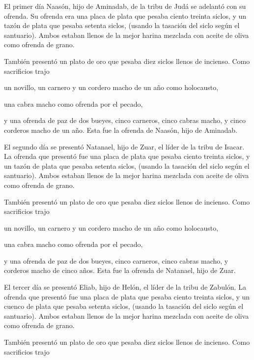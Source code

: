  El primer día Naasón, hijo de Aminadab, de la tribu de
Judá se adelantó con su ofrenda.  Su ofrenda era una
placa de plata que pesaba ciento treinta siclos, y un tazón de plata que
pesaba setenta siclos, (usando la tasación del siclo según el
santuario). Ambos estaban llenos de la mejor harina mezclada con aceite
de oliva como ofrenda de grano.

 También presentó un plato de oro que pesaba diez siclos
llenos de incienso. Como sacrificios trajo

 un novillo, un carnero y un cordero macho de un año como
holocausto,

 una cabra macho como ofrenda por el pecado,

 y una ofrenda de paz de dos bueyes, cinco carneros,
cinco cabras macho, y cinco corderos macho de un año. Esta fue la
ofrenda de Naasón, hijo de Aminadab.

 El segundo día se presentó Natanael, hijo de Zuar, el
líder de la tribu de Isacar.  La ofrenda que presentó fue
una placa de plata que pesaba ciento treinta siclos, y un tazón de plata
que pesaba setenta siclos, (usando la tasación del siclo según el
santuario). Ambos estaban llenos de la mejor harina mezclada con aceite
de oliva como ofrenda de grano.

 También presentó un plato de oro que pesaba diez siclos
llenos de incienso. Como sacrificios trajo

 un novillo, un carnero y un cordero macho de un año como
holocausto,

 una cabra macho como ofrenda por el pecado,

 y una ofrenda de paz de dos bueyes, cinco carneros,
cinco cabras macho, y corderos macho de cinco años. Esta fue la ofrenda
de Natanael, hijo de Zuar.

 El tercer día se presentó Eliab, hijo de Helón, el líder
de la tribu de Zabulón.  La ofrenda que presentó fue una
placa de plata que pesaba ciento treinta siclos, y un cuenco de plata
que pesaba setenta siclos, (usando la tasación del siclo según el
santuario). Ambos estaban llenos de la mejor harina mezclada con aceite
de oliva como ofrenda de grano.

 También presentó un plato de oro que pesaba diez siclos
llenos de incienso. Como sacrificios trajo

